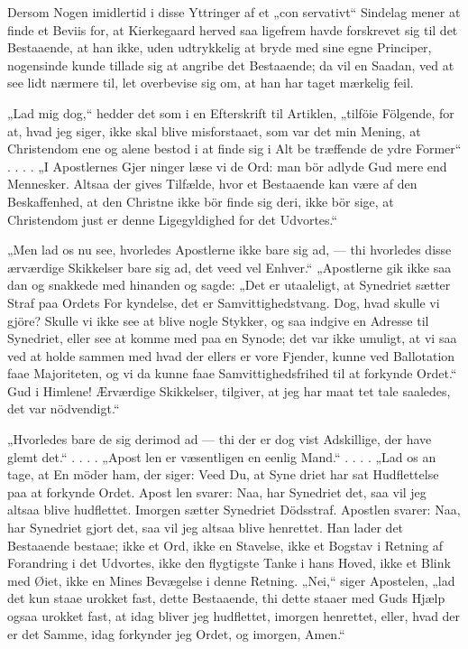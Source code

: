 \documentclass[12pt,a4paper]{article}
\newcommand{\opage}[1]{\marginnote{\footnotesize\textit{[#1]}}}
\begin{document}
Dersom Nogen imidlertid i disse Yttringer af et „con\-%
servativt“ Sindelag mener at finde et Beviis for, at
Kierkegaard herved saa ligefrem havde forskrevet sig
til det Bestaaende, at han ikke, uden udtrykkelig at bryde
med sine egne Principer, nogensinde kunde tillade sig
at angribe det Bestaaende; da vil en Saadan, ved at
see lidt nærmere til, let overbevise sig om, at han har
taget mærkelig feil.

„Lad mig dog,“ hedder det som i en Efterskrift til
Artiklen, „tilföie Fölgende, for at, hvad jeg siger, ikke
skal blive misforstaaet, som var det min Mening, at
Christendom ene og alene bestod i at finde sig i Alt be\-%
\opage{23}%
træffende de ydre Former“ . . . . „I Apostlernes Gjer\-%
ninger læse vi de Ord: man bör adlyde Gud mere end
Mennesker. Altsaa der gives Tilfælde, hvor et Bestaaende
kan være af den Beskaffenhed, at den Christne ikke bör
finde sig deri, ikke bör sige, at Christendom just er
denne Ligegyldighed for det Udvortes.“

„Men lad os nu see, hvorledes Apostlerne ikke bare
sig ad, --- thi hvorledes disse ærværdige Skikkelser bare
sig ad, det veed vel Enhver.“ „Apostlerne gik ikke saa\-%
dan og snakkede med hinanden og sagde: „Det er
utaaleligt, at Synedriet sætter Straf paa Ordets For\-%
kyndelse, det er Samvittighedstvang. Dog, hvad skulle
vi gjöre? Skulle vi ikke see at blive nogle Stykker, og
saa indgive en Adresse til Synedriet, eller see at komme
med paa en Synode; det var ikke umuligt, at vi saa
ved at holde sammen med hvad der ellers er vore Fjender,
kunne ved Ballotation faae Majoriteten, og vi da kunne
faae Samvittighedsfrihed til at forkynde Ordet.“ Gud i
Himlene! Ærværdige Skikkelser, tilgiver, at jeg har maat\-%
tet tale saaledes, det var nödvendigt.“

„Hvorledes bare de sig derimod ad --- thi der er
dog vist Adskillige, der have glemt det.“ . . . . „Apost\-%
len er væsentligen en eenlig Mand.“ . . . . „Lad os an\-%
tage, at En möder ham, der siger: Veed Du, at Syne\-%
driet har sat Hudflettelse paa at forkynde Ordet. Apost\-%
len svarer: Naa, har Synedriet det, saa vil jeg altsaa
blive hudflettet. Imorgen sætter Synedriet Dödsstraf.
Apostlen svarer: Naa, har Synedriet gjort det, saa vil
jeg altsaa blive henrettet. Han lader det Bestaaende
bestaae; ikke et Ord, ikke en Stavelse, ikke et Bogstav
i Retning af Forandring i det Udvortes, ikke den flygtigste
Tanke i hans Hoved, ikke et Blink med Øiet, ikke en
Mines Bevægelse i denne Retning. „Nei,“ siger Apostelen,
„lad det kun staae urokket fast, dette Bestaaende, thi
dette staaer med Guds Hjælp ogsaa urokket fast, at idag
bliver jeg hudflettet, imorgen henrettet, eller, hvad der
\opage{24} er det Samme, idag forkynder jeg Ordet, og imorgen,
Amen.“
\end{document}
